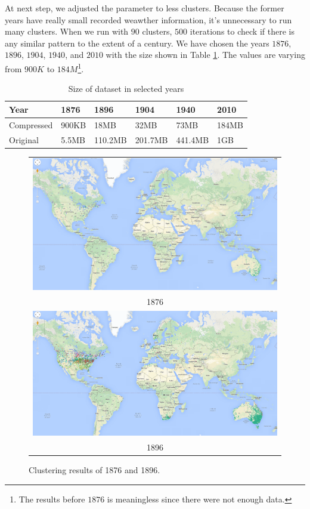 At next step, we adjusted the parameter to less clusters. Because the former years have really small recorded weawther information, it's unnecessary to run many clusters. When we run with $90$ clusters, $500$ iterations to check if there is any similar pattern to the extent of a century. We have chosen the years $1876$, $1896$, $1904$, $1940$, and $2010$ with the size shown in Table \ref{table:5years}. The values are varying from $900K$ to $184M$\footnote{
The results before $1876$ is meaningless since there were not enough data.}.

\begin{table}[htbp]
    \centering
    \label{table:5years}
    \begin{tabular}{|l|l|l|l|l|l|}
        \hline
        Year & 1876 & 1896 & 1904 & 1940 & 2010 \\
        \hline
        Compressed & 900KB & 18MB & 32MB & 73MB & 184MB \\
        \hline
        Original & 5.5MB & 110.2MB & 201.7MB & 441.4MB & 1GB \\
        \hline
    \end{tabular}
    \caption{Size of dataset in selected years}
\end{table}

\begin{figure}[htbp]
    \centering
    \begin{tabular}{c}
        \includegraphics[width =\linewidth]{images/1876.png}\\ 1876\\
        \includegraphics[width =\linewidth]{images/1896.png}\\ 1896\\
   \end{tabular}
    \caption{Clustering results of 1876 and 1896.}
\end{figure}


